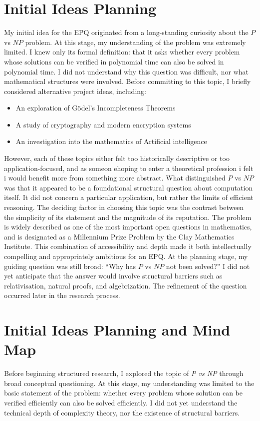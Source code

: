 \documentclass[12pt]{article}
\begin{document}
\section{Initial Ideas Planning}
My initial idea for the EPQ originated from a long-standing curiosity about the $P$ vs $NP$ problem.
At this stage, my understanding of the problem was extremely limited.
I knew only its formal definition: that it asks whether every problem whose solutions can be verified in polynomial time can also be solved in polynomial time.
I did not understand why this question was difficult, nor what mathematical structures were involved.
Before committing to this topic, I briefly considered alternative project ideas, including:
\begin{itemize}
    \item An exploration of Gödel's Incompleteness Theorems
    \item A study of cryptography and modern encryption systems
    \item An investigation into the mathematics of Artificial intelligence
\end{itemize}
However, each of these topics either felt too historically descriptive or too application-focused, and as someon ehoping to enter a theoretical profession i felt i would benefit more from something more abstract.
What distinguished $P$ vs $NP$ was that it appeared to be a foundational structural question about computation itself.
It did not concern a particular application, but rather the limits of efficient reasoning.
The deciding factor in choosing this topic was the contrast between the simplicity of its statement and the magnitude of its reputation.
The problem is widely described as one of the most important open questions in mathematics, and is designated as a Millennium Prize Problem by the Clay Mathematics Institute.
This combination of accessibility and depth made it both intellectually compelling and appropriately ambitious for an EPQ.
At the planning stage, my guiding question was still broad: “Why has $P$ vs $NP$ not been solved?” I did not yet anticipate that the answer would involve structural barriers such as relativisation, natural proofs, and algebrization.
The refinement of the question occurred later in the research process.

\section{Initial Ideas Planning and Mind Map}

Before beginning structured research, I explored the topic of \textit{P vs NP} through broad conceptual questioning. At this stage, my understanding was limited to the basic statement of the problem: whether every problem whose solution can be verified efficiently can also be solved efficiently. I did not yet understand the technical depth of complexity theory, nor the existence of structural barriers.
\end{document}
